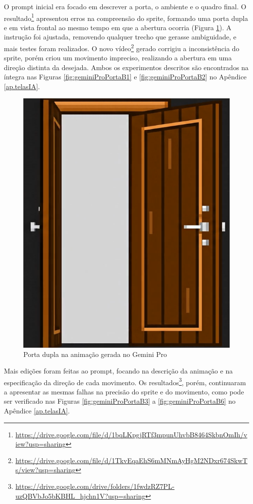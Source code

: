 \begin{figure}[htbp]
\end{figure}

O prompt inicial era focado em descrever a porta, o ambiente e o quadro final. O resultado\footnote{\url{https://drive.google.com/file/d/1bqLKpgjRTf3mpunUhvbB8464SkbnOmIh/view?usp=sharing}} apresentou erros na compreensão do sprite, formando uma porta dupla e em vista frontal ao mesmo tempo em que a abertura ocorria (Figura \ref{fig:geminiProPortaBDupla}). A instrução foi ajustada, removendo qualquer trecho que gerasse ambiguidade, e mais testes foram realizados. O novo vídeo\footnote{\url{https://drive.google.com/file/d/1TkvEqaEhS6mMNmAyHgM2NDxr674SkwTs/view?usp=sharing}} gerado corrigiu a inconsistência do sprite, porém criou um movimento impreciso, realizando a abertura em uma direção distinta da desejada. Ambos os experimentos descritos são encontrados na íntegra nas Figuras \ref{fig:geminiProPortaB1} e \ref{fig:geminiProPortaB2} no Apêndice \ref{ap.telasIA}.

\begin{figure}[htbp]
    \centering
    \caption{\small Porta dupla na animação gerada no Gemini Pro}
    \label{fig:geminiProPortaBDupla}
    \includegraphics[width=0.4\linewidth]{figs/geminiPro/chat7/portaDupla.PNG}
\end{figure}

Mais edições foram feitas ao prompt, focando na descrição da animação e na especificação da direção de cada movimento. Os resultados\footnote{\url{https://drive.google.com/drive/folders/1fwdzRZ7PL-uzQBVbJo5bKBHL_hjchn1V?usp=sharing}}, porém, continuaram a apresentar as mesmas falhas na precisão do sprite e do movimento, como pode ser verificado nas Figuras \ref{fig:geminiProPortaB3} a \ref{fig:geminiProPortaB6} no Apêndice \ref{ap.telasIA}.

